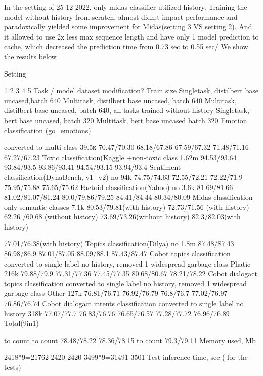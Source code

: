 In the setting of 25-12-2022, only midas classifier utilized history. Training the model without history from scratch, almost didn;t impact performance and paradoxically yielded some improvement for Midas(setting 3 VS setting 2). And it allowed to use 2x less max sequence length and have only 1 model prediction to cache, which decreased the prediction time from 0.73 sec to 0.55 sec/
We show the results below

Setting




1
2
3
4
5
Task / model
dataset modification?
Train size
Singletask, distilbert base uncased,batch 640
Multitask, distilbert base uncased, batch 640
Multitask, distilbert base uncased, batch 640, all tasks trained without history
Singletask, bert base uncased, batch 320
Multitask, bert base uncased
batch 320
Emotion classification (go_emotions)


converted to multi-class
39.5к
70.47/70.30
68.18/67.86
67.59/67.32
71.48/71.16
67.27/67.23
Toxic classification(Kaggle
+non-toxic class
1.62m
94.53/93.64
93.84/93.5
93.86/93.41
94.54/93.15
93.94/93.4
Sentiment classification(DynaBench, v1+v2)
no
94k
74.75/74.63
72.55/72.21
72.22/71.9
75.95/75.88
75.65/75.62
Factoid classification(Yahoo)
no
3.6k
81.69/81.66
81.02/81.07/81.24
80.0/79.86/79.25
84.41/84.44
80.34/80.09
Midas classification
only semantic classes
7.1k
80.53/79.81(with history)
72.73/71.56 (with history)
62.26 /60.68 (without history)
73.69/73.26(without history)
82.3/82.03(with history)


77.01/76.38(with history)
Topics classification(Dilya)
no
1.8m
87.48/87.43
86.98/86.9
87.01/87.05
88.09/88.1
87.43/87.47
Cobot topics classification
converted to single label no history, removed 1 widespread garbage class Phatic
216k
79.88/79.9
77.31/77.36
77.45/77.35
80.68/80.67
78.21/78.22
Cobot dialogact topics classification
converted to single label no history, removed 1 widespread garbage class Other
127k
76.81/76.71
76.92/76.79
76.8/76.7
77.02/76.97
76.86/76.74
Cobot dialogact intents classification
converted to single label no history
318k
77.07/77.7
76.83/76.76
76.65/76.57
77.28/77.72
76.96/76.89
Total(9in1)


to count
to count
78.48/78.22
78.36/78.15
to count
79.3/79.11
Memory used, Mb




2418*9=21762
2420
2420
3499*9=31491
3501
Test inference time, sec ( for the tests)






